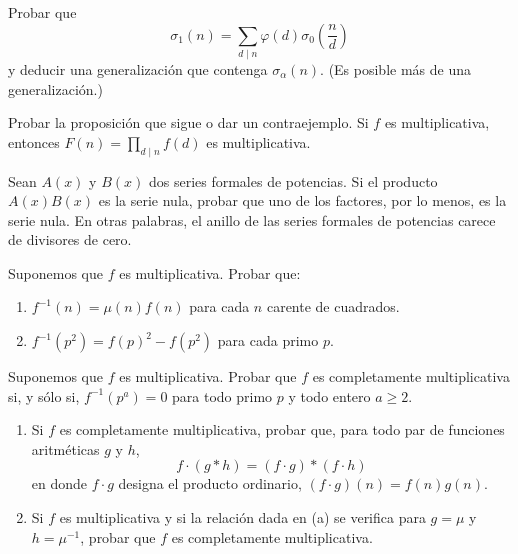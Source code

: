 \documentclass[12pt,a4paper]{book}
\begin{document}
    \begin{ejercicio}
        Probar que
        \begin{equation*}
            \sigma_{1}(n)=\sum_{d\mid n}\varphi(d)\sigma_{0}\left(\frac{n}{d}\right)
        \end{equation*}
        y deducir una generalización que contenga $\sigma_{\alpha}(n)$. (Es posible más de
        una generalización.)
    \end{ejercicio}

    \begin{ejercicio}
        Probar la proposición que sigue o dar un contraejemplo. Si $f$ es multiplicativa,
        entonces $F(n)=\prod_{d\mid n}f(d)$ es multiplicativa.
    \end{ejercicio}

    \begin{ejercicio}
        Sean $A(x)$ y $B(x)$ dos series formales de potencias. Si el producto $A(x)B(x)$
        es la serie nula, probar que uno de los factores, por lo menos, es la serie nula.
        En otras palabras, el anillo de las series formales de potencias carece de
        divisores de cero.
    \end{ejercicio}

    \begin{ejercicio}
        Suponemos que $f$ es multiplicativa. Probar que:
        \begin{enumerate}
            \item[(a)] $f^{-1}(n)=\mu(n)f(n)$ para cada $n$ carente de cuadrados.
            \item[(b)] $f^{-1}(p^{2})=f(p)^{2}-f(p^{2})$ para cada primo $p$.
        \end{enumerate}
    \end{ejercicio}

    \begin{ejercicio}
        Suponemos que $f$ es multiplicativa. Probar que $f$ es completamente
        multiplicativa si, y sólo si, $f^{-1}(p^{a})=0$ para todo primo $p$ y todo entero
        $a\geq2$.
    \end{ejercicio}

    \begin{ejercicio}
        \begin{enumerate}
            \item[(a)] Si $f$ es completamente multiplicativa, probar que, para todo par
            de funciones aritméticas $g$ y $h$,
            \begin{equation*}
                f\cdot(g*h)=(f\cdot g)*(f\cdot h)
            \end{equation*}
            en donde $f\cdot g$ designa el producto ordinario, $(f\cdot g)(n)=f(n)g(n)$.
            \item[(b)] Si $f$ es multiplicativa y si la relación dada en (a) se verifica
            para $g=\mu$ y $h=\mu^{-1}$, probar que $f$ es completamente multiplicativa.
        \end{enumerate}
    \end{ejercicio}
\end{document}
